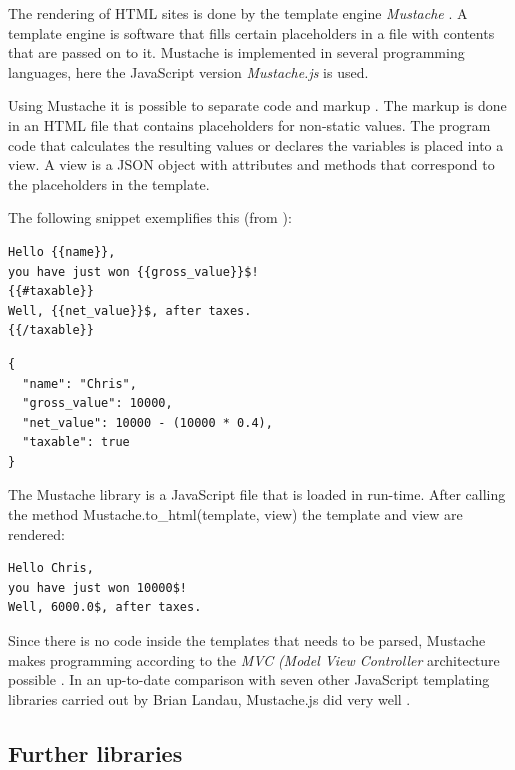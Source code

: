 The rendering of HTML sites is done by the template engine \textit{Mustache} \cite{mustache:homepage}. A template engine is software that fills certain placeholders in a file with contents that are passed on to it. Mustache is implemented in several programming languages, here the JavaScript version \textit{Mustache.js} is used.

Using Mustache it is possible to separate code and markup \cite{mustache:couchio}. The markup is done in an HTML file that contains placeholders for non-static values. The program code that calculates the resulting values or declares the variables is placed into a view. A view is a JSON object with attributes and methods that correspond to the placeholders in the template.

The following snippet exemplifies this (from \cite{mustache:other}):

\medskip
\begin{lstlisting}[caption=Mustache.js: Example of a template]
Hello {{name}},
you have just won {{gross_value}}$!
{{#taxable}}
Well, {{net_value}}$, after taxes.
{{/taxable}}
\end{lstlisting}


\medskip
\begin{lstlisting}[caption=Mustache.js: View passed on, label=lst:mustache]
{
  "name": "Chris",
  "gross_value": 10000,
  "net_value": 10000 - (10000 * 0.4),
  "taxable": true
}
\end{lstlisting}

The Mustache library is a JavaScript file that is loaded in run-time. After calling the method {\selectfont Mustache.to\_html(template, view)} the template and view are rendered:

\medskip
\begin{lstlisting}[caption=Mustache.js: result]
Hello Chris,
you have just won 10000$!
Well, 6000.0$, after taxes.
\end{lstlisting}

Since there is no code inside the templates that needs to be parsed, Mustache makes programming according to the \textit{MVC} \textit{(Model View Controller} architecture possible \cite{mustache:couchio}. In an up-to-date comparison with seven other JavaScript templating libraries carried out by Brian Landau, Mustache.js did very well \cite{mustache:bench}.


\subsection{Further libraries}

